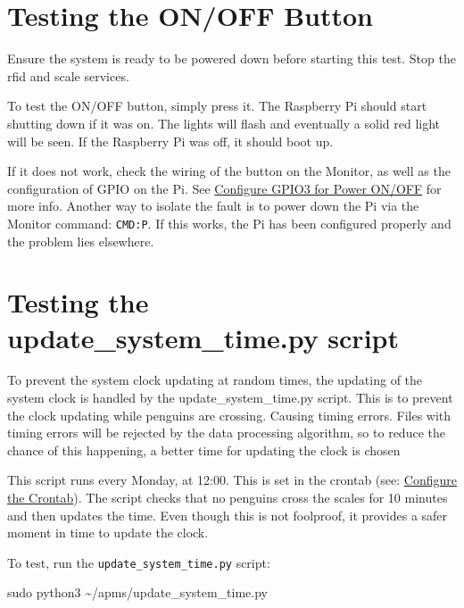 \documentclass[
  letterpaper,
]{scrbook}
\newenvironment{Shaded}{\begin{snugshade}}{\end{snugshade}}
\newcommand{\FunctionTok}[1]{\textcolor[rgb]{0.28,0.35,0.67}{#1}}
\newcommand{\NormalTok}[1]{\textcolor[rgb]{0.00,0.23,0.31}{#1}}
\begin{document}
\section{Testing the ON/OFF Button}\label{testing-the-onoff-button}

Ensure the system is ready to be powered down before starting this test.
Stop the rfid and scale services.

To test the ON/OFF button, simply press it. The Raspberry Pi should
start shutting down if it was on. The lights will flash and eventually a
solid red light will be seen. If the Raspberry Pi was off, it should
boot up.

If it does not work, check the wiring of the button on the Monitor, as
well as the configuration of GPIO on the Pi. See
\hyperref[Configureux5cux2520GPIO3ux5cux2520forux5cux2520Powerux5cux2520ONux2fOFF]{Configure
GPIO3 for Power ON/OFF} for more info. Another way to isolate the fault
is to power down the Pi via the Monitor command: \texttt{CMD:P}. If this
works, the Pi has been configured properly and the problem lies
elsewhere.

\section{Testing the update\_system\_time.py
script}\label{testing-the-update_system_time.py-script}

To prevent the system clock updating at random times, the updating of
the system clock is handled by the update\_system\_time.py script. This
is to prevent the clock updating while penguins are crossing. Causing
timing errors. Files with timing errors will be rejected by the data
processing algorithm, so to reduce the chance of this happening, a
better time for updating the clock is chosen

This script runs every Monday, at 12:00. This is set in the crontab
(see: \hyperref[Configureux5cux2520theux5cux2520Crontab]{Configure the
Crontab}). The script checks that no penguins cross the scales for 10
minutes and then updates the time. Even though this is not foolproof, it
provides a safer moment in time to update the clock.

To test, run the \texttt{update\_system\_time.py} script:

\begin{Shaded}
\begin{Highlighting}[]
\FunctionTok{sudo}\NormalTok{ python3 \textasciitilde{}/apms/update\_system\_time.py}
\end{Highlighting}
\end{Shaded}
\end{document}
